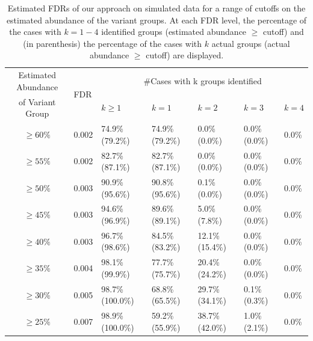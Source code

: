 
\begin{table}[h]
  \centering
  \caption[Estimated FDRs of our approach on simulated data]{Estimated FDRs of our approach on simulated data for a range of cutoffs on the estimated abundance of the variant groups. At each FDR level, the percentage of the cases with $k = 1 - 4$ identified groups (estimated abundance $\ge$ cutoff) and (in parenthesis) the percentage of the cases with $k$ actual groups (actual abundance $\ge$ cutoff) are displayed.
  }\label{tbl:SimFDR}
\begin{tabular}{|c|l|l|l|l|l|l|}
\hline
Estimated Abundance & \multirow{2}{*}{FDR} & \multicolumn{5}{|c|}{\#Cases with k groups identified }\\
of Variant Group & & $k\ge 1$ & $k=1$ & $k=2$ & $k=3$ & $k=4$ \\
\hline
$\ge 60\%$ &0.002 &74.9\% (79.2\%) &74.9\% (79.2\%) &0.0\% (0.0\%) &0.0\% (0.0\%) &0.0\%\\
$\ge 55\%$ &0.002 &82.7\% (87.1\%) &82.7\% (87.1\%) &0.0\% (0.0\%) &0.0\% (0.0\%) &0.0\%\\
$\ge 50\%$ &0.003 &90.9\% (95.6\%) &90.8\% (95.6\%) &0.1\% (0.0\%) &0.0\% (0.0\%) &0.0\%\\
$\ge 45\%$ &0.003 &94.6\% (96.9\%) &89.6\% (89.1\%) &5.0\% (7.8\%) &0.0\% (0.0\%) &0.0\%\\
$\ge 40\%$ &0.003 &96.7\% (98.6\%) &84.5\% (83.2\%) &12.1\% (15.4\%) &0.0\% (0.0\%) &0.0\%\\
$\ge 35\%$ &0.004 &98.1\% (99.9\%) &77.7\% (75.7\%) &20.4\% (24.2\%) &0.0\% (0.0\%) &0.0\%\\
$\ge 30\%$ &0.005 &98.7\% (100.0\%) &68.8\% (65.5\%) &29.7\% (34.1\%) &0.1\% (0.3\%) &0.0\%\\
$\ge 25\%$ &0.007 &98.9\% (100.0\%) &59.2\% (55.9\%) &38.7\% (42.0\%) &1.0\% (2.1\%) &0.0\%\\

\end{tabular}
\end{table}
